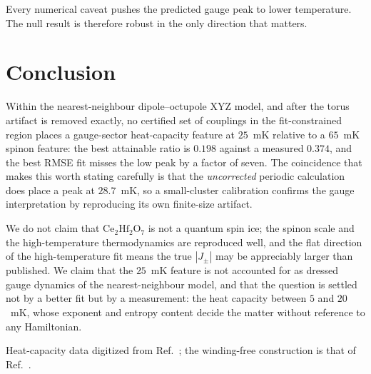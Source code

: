 \documentclass[aps,prb,preprint,amsmath,amssymb,superscriptaddress,
longbibliography,floatfix]{revtex4-2}
\newcommand{\Jpm}{J_{\pm}}
\newcommand{\CHO}{\mathrm{Ce_2Hf_2O_7}}
\begin{document}
Every numerical caveat pushes the predicted gauge peak to lower temperature.
The null result is therefore robust in the only direction that matters.

\section{Conclusion}

Within the nearest-neighbour dipole--octupole XYZ model, and after the torus
artifact is removed exactly, no certified set of couplings in the
fit-constrained region places a gauge-sector heat-capacity feature at $25$~mK
relative to a $65$~mK spinon feature: the best attainable ratio is $0.198$
against a measured $0.374$, and the best RMSE fit misses the low peak by a
factor of seven.  The coincidence that makes this worth stating carefully is
that the \emph{uncorrected} periodic calculation does place a peak at
$28.7$~mK, so a small-cluster calibration confirms the gauge interpretation by
reproducing its own finite-size artifact.

We do not claim that $\CHO$ is not a quantum spin ice; the spinon scale and the
high-temperature thermodynamics are reproduced well, and the flat direction of
the high-temperature fit means the true $|\Jpm|$ may be appreciably larger than
published.  We claim that the $25$~mK feature is not accounted for as dressed
gauge dynamics of the nearest-neighbour model, and that the question is settled
not by a better fit but by a measurement: the heat capacity between $5$ and
$20$~mK, whose exponent and entropy content decide the matter without reference
to any Hamiltonian.

\begin{acknowledgments}
Heat-capacity data digitized from Ref.~\cite{Smith2025}; the winding-free
construction is that of Ref.~\cite{ZhouKimMask}.
\end{acknowledgments}



\end{document}
